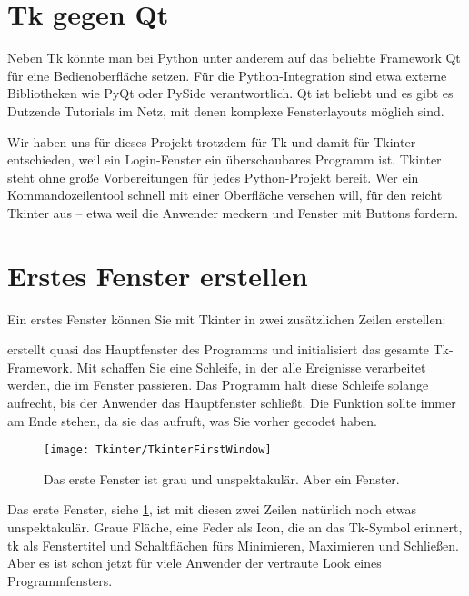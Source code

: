 
\section{Tk gegen Qt}

Neben Tk könnte man bei Python unter anderem auf das beliebte Framework Qt für eine Bedienoberfläche setzen. Für die Python-Integration sind etwa externe Bibliotheken wie PyQt oder PySide verantwortlich. Qt ist beliebt und es gibt es Dutzende Tutorials im Netz, mit denen komplexe Fensterlayouts möglich sind.

Wir haben uns für dieses Projekt trotzdem für Tk und damit für Tkinter entschieden, weil ein Login-Fenster ein überschaubares Programm ist. Tkinter steht ohne große Vorbereitungen für jedes Python-Projekt bereit. Wer ein Kommandozeilentool schnell mit einer Oberfläche versehen will, für den reicht Tkinter aus – etwa weil die Anwender meckern und Fenster mit Buttons fordern.


\section{Erstes Fenster erstellen}

Ein erstes Fenster können Sie mit Tkinter in zwei zusätzlichen Zeilen erstellen:

\medskip



\medskip

 erstellt quasi das Hauptfenster des Programms und initialisiert das gesamte Tk-Framework. Mit  schaffen Sie eine Schleife, in der alle Ereignisse verarbeitet werden, die im Fenster passieren. Das Programm hält diese Schleife solange aufrecht, bis der Anwender das Hauptfenster schließt. Die Funktion  sollte immer am Ende stehen, da sie das aufruft, was Sie vorher gecodet haben.

\begin{figure}
  \texttt{[image: Tkinter/TkinterFirstWindow]}
  \caption{Das erste Fenster ist grau und unspektakulär. Aber ein Fenster.} \label{TkinterFirstWindow}
\end{figure}

Das erste Fenster, siehe \ref{TkinterFirstWindow}, ist mit diesen zwei Zeilen natürlich noch etwas unspektakulär. Graue Fläche, eine Feder als Icon, die an das Tk-Symbol erinnert, tk als Fenstertitel und Schaltflächen fürs Minimieren, Maximieren und Schließen. Aber es ist schon jetzt für viele Anwender der vertraute Look eines Programmfensters.

